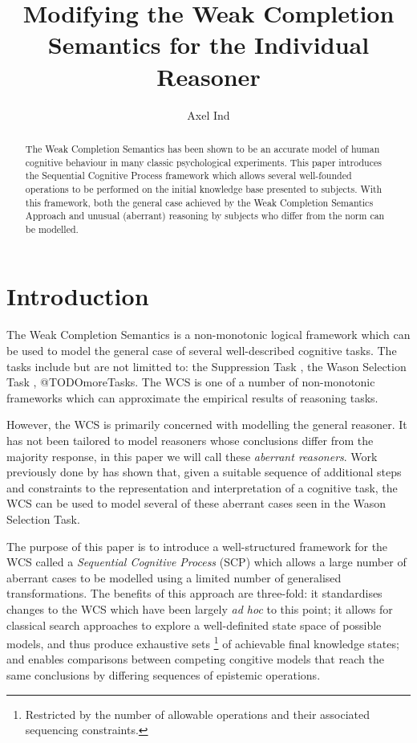 \documentclass{article}
\begin{document}
\title{Modifying the Weak Completion Semantics for the Individual Reasoner}
\author{Axel Ind}

\maketitle

\begin{abstract}
The Weak Completion Semantics has been shown to be an accurate model of human cognitive behaviour in many classic psychological experiments. This paper introduces the Sequential Cognitive Process framework which allows several well-founded operations to be performed on the initial knowledge base presented to subjects. With this framework, both the general case achieved by the Weak Completion Semantics Approach and unusual (aberrant) reasoning by subjects who differ from the norm can be modelled.
\end{abstract}

\section{Introduction}
The Weak Completion Semantics \citep{holldobler2015weak} is a non-monotonic logical framework which can be used to model the general case of several well-described cognitive tasks. The tasks include but are not limitted to: the Suppression Task \citep{byrne1989suppressing}, the Wason Selection Task \citep{wason1968reasoning}, @TODOmoreTasks. The WCS is one of a number of non-monotonic frameworks \citep{ragni2017formal} which can approximate the empirical results of reasoning tasks.

However, the WCS is primarily concerned with modelling the general reasoner. It has not been tailored to model reasoners whose conclusions differ from the majority response, in this paper we will call these \textit{aberrant reasoners}. Work previously done by \cite{breu2019weak} has shown that, given a suitable sequence of additional steps and constraints to the representation and interpretation of a cognitive task, the WCS can be used to model several of these aberrant cases seen in the Wason Selection Task.

The purpose of this paper is to introduce a well-structured framework for the WCS called a \textit{Sequential Cognitive Process} (SCP) which allows a large number of aberrant cases to be modelled using a limited number of generalised transformations. The benefits of this approach are three-fold: it standardises changes to the WCS which have been largely \textit{ad hoc} to this point; it allows for classical search approaches to explore a well-definited state space of possible models, and thus produce exhaustive sets \footnote{Restricted by the number of allowable operations and their associated sequencing constraints.} of achievable final knowledge states; and enables comparisons between competing congitive models that reach the same conclusions by differing sequences of epistemic operations.
\end{document}

